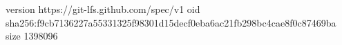 version https://git-lfs.github.com/spec/v1
oid sha256:f9cb7136227a55331325f98301d15decf0eba6ac21fb298bc4cae8f0c87469ba
size 1398096
